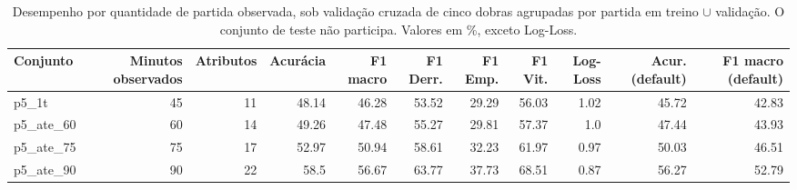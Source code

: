 \begin{table}[htbp]
\centering
\caption{Desempenho por quantidade de partida observada, sob validação cruzada de cinco dobras agrupadas por partida em treino $\cup$ validação. O conjunto de teste não participa. Valores em \%, exceto Log-Loss.}
\label{tab:wp5-progressao}
\small
\begin{tabular}{lrrrrrrrrrr}
\toprule
Conjunto & Minutos observados & Atributos & Acurácia & F1 macro & F1 Derr. & F1 Emp. & F1 Vit. & Log-Loss & Acur. (default) & F1 macro (default) \\
\midrule
p5\_1t & 45 & 11 & 48.14 & 46.28 & 53.52 & 29.29 & 56.03 & 1.02 & 45.72 & 42.83 \\
p5\_ate\_60 & 60 & 14 & 49.26 & 47.48 & 55.27 & 29.81 & 57.37 & 1.0 & 47.44 & 43.93 \\
p5\_ate\_75 & 75 & 17 & 52.97 & 50.94 & 58.61 & 32.23 & 61.97 & 0.97 & 50.03 & 46.51 \\
p5\_ate\_90 & 90 & 22 & 58.5 & 56.67 & 63.77 & 37.73 & 68.51 & 0.87 & 56.27 & 52.79 \\
\bottomrule
\end{tabular}
\end{table}

